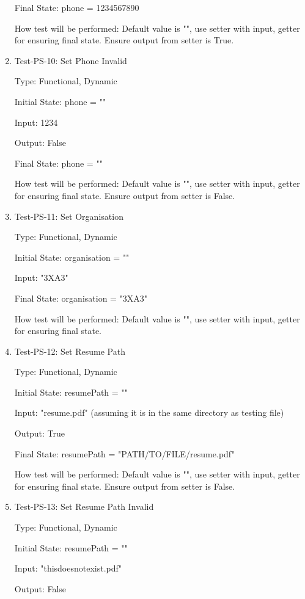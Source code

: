 \documentclass[12pt, titlepage]{article}
\makeatletter
\def\itemlabel#1#2{\def\@currentlabel{#2}\phantomsection\label{#1}}
\makeatother
\begin{document}
\begin{enumerate}
Final State: phone = 1234567890

How test will be performed: Default value is "", use setter with input, getter for ensuring final state. Ensure output from setter is True.
\item{Test-PS-10: Set Phone Invalid\\}

Type: Functional, Dynamic

Initial State: phone = ""

Input: 1234

Output: False

Final State: phone = ""

How test will be performed: Default value is "", use setter with input, getter for ensuring final state. Ensure output from setter is False.
\item{Test-PS-11: Set Organisation\\}

Type: Functional, Dynamic

Initial State: organisation = ""

Input: "3XA3"

Final State: organisation = "3XA3" 

How test will be performed: Default value is "", use setter with input, getter for ensuring final state.
\item{\itemlabel{item:PS-12}{Test-PS-12} Test-PS-12: Set Resume Path\\}

Type: Functional, Dynamic

Initial State: resumePath = ""

Input: "resume.pdf" (assuming it is in the same directory as testing file)

Output: True

Final State: resumePath = "PATH/TO/FILE/resume.pdf"

How test will be performed: Default value is "", use setter with input, getter for ensuring final state. Ensure output from setter is False.
\item{\itemlabel{item:PS-13}{Test-PS-13} Test-PS-13: Set Resume Path Invalid\\}

Type: Functional, Dynamic

Initial State: resumePath = ""

Input: "thisdoesnotexist.pdf"

Output: False


\end{enumerate}
\end{document}
